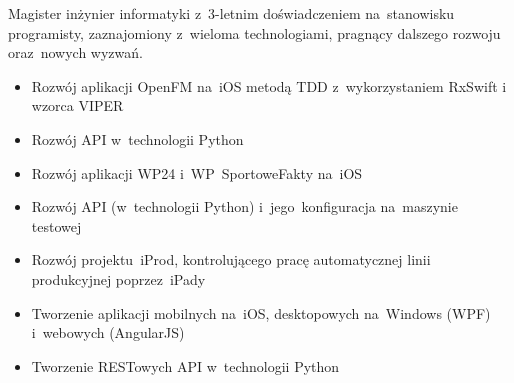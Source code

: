 \documentclass[11pt,a4paper]{article}
\begin{document}
    \bigskip

  
    \smallskip

    \noindent
    Magister inżynier informatyki z~3-letnim doświadczeniem na~stanowisku programisty, zaznajomiony z~wieloma
    technologiami, pragnący dalszego rozwoju oraz~nowych wyzwań.
  

    \bigskip


    \smallskip

    \vspace{-0.2cm}
    \begin{itemize} \itemsep1pt \parskip0pt 
        \item Rozwój aplikacji OpenFM na~iOS metodą TDD z~wykorzystaniem RxSwift i wzorca VIPER
        \item Rozwój API w~technologii Python
    \end{itemize}
    \vspace{-0.2cm}
    \vspace{-0.2cm}
    \begin{itemize} \itemsep1pt \parskip0pt 
        \item Rozwój aplikacji WP24 i~WP~SportoweFakty na~iOS
        \item Rozwój API (w~technologii Python) i~jego~konfiguracja na~maszynie testowej
    \end{itemize}
    \vspace{-0.2cm}
    \vspace{-0.2cm}
    \begin{itemize} \itemsep1pt \parskip0pt 
        \item Rozwój projektu~iProd, kontrolującego pracę automatycznej linii produkcyjnej poprzez~iPady
        \item Tworzenie aplikacji mobilnych na~iOS, desktopowych na~Windows (WPF) i~webowych (AngularJS)
        \item Tworzenie RESTowych API w~technologii Python
    \end{itemize}
\end{document}
